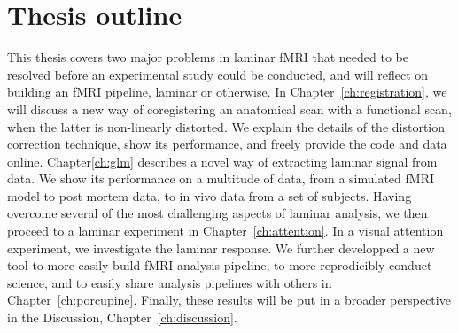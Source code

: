 
\section*{Thesis outline}
This thesis covers two major problems in laminar fMRI that needed to be resolved before an experimental study could be conducted, and will reflect on building an fMRI pipeline, laminar or otherwise. In Chapter~\ref{ch:registration}, we will discuss a new way of coregistering an anatomical scan with a functional scan, when the latter is non-linearly distorted. We explain the details of the distortion correction technique, show its performance, and freely provide the code and data online. Chapter\ref{ch:glm} describes a novel way of extracting laminar signal from data. We show its performance on a multitude of data, from a simulated fMRI model to post mortem data, to in vivo data from a set of subjects. Having overcome several of the most challenging aspects of laminar analysis, we then proceed to a laminar experiment in Chapter~\ref{ch:attention}. In a visual attention experiment, we investigate the laminar response. We further developped a new tool to more easily build fMRI analysis pipeline, to more reprodicibly conduct science, and to easily share analysis pipelines with others in Chapter~\ref{ch:porcupine}. Finally, these results will be put in a broader perspective in the Discussion, Chapter~\ref{ch:discussion}.